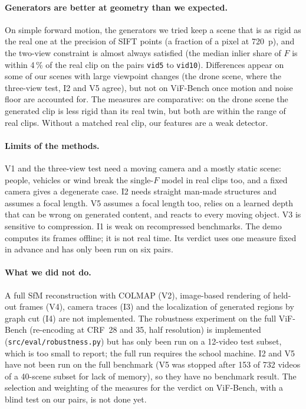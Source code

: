 \documentclass[11pt,a4paper]{article}
\begin{document}
\paragraph{Generators are better at geometry than we expected.}
On simple forward motion, the generators we tried keep a scene that is as rigid as the real
one at the precision of SIFT points (a fraction of a pixel at 720~p), and the two-view
constraint is almost always satisfied (the median inlier share of $F$ is within 4\,\% of the
real clip on the pairs \texttt{vid5} to \texttt{vid10}). Differences appear on some of our
scenes with large viewpoint changes (the drone
scene, where the three-view test, I2 and V5 agree), but not on ViF-Bench once motion and noise
floor are accounted for. The measures are comparative: on the drone scene the generated clip
is less rigid than its real twin, but both are within the range of real clips. Without a
matched real clip, our features are a weak detector.

\paragraph{Limits of the methods.}
V1 and the three-view test need a moving camera and a mostly static scene: people, vehicles
or wind break the single-$F$ model in real clips too, and a fixed camera gives a degenerate
case. I2 needs straight man-made structures and assumes a focal length. V5 assumes a focal
length too, relies on a learned depth that can be wrong on generated content, and reacts to
every moving object. V3 is sensitive to compression. I1 is weak on recompressed benchmarks.
The demo computes its frames offline; it is not real time. Its verdict uses one measure fixed
in advance and has only been run on six pairs.

\paragraph{What we did not do.}
A full SfM reconstruction with COLMAP (V2), image-based rendering of held-out frames (V4),
camera traces (I3) and the localization of generated regions by graph cut (I4) are not
implemented. The robustness experiment on the full ViF-Bench (re-encoding at CRF~28 and 35,
half resolution) is implemented (\texttt{src/eval/robustness.py}) but has only been run on a
12-video test subset, which is too small to report; the full run requires the school machine.
I2 and V5 have not been run on the full benchmark (V5 was stopped after 153 of 732 videos of a
40-scene subset for lack of memory), so they have no benchmark result. The selection and
weighting of the measures for the verdict on ViF-Bench, with a blind test on our pairs, is
not done yet.
\end{document}
